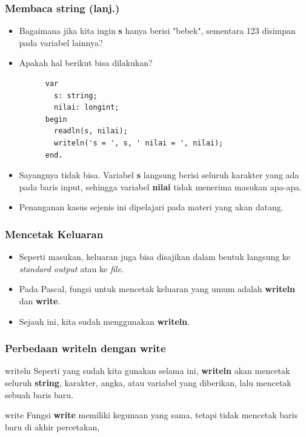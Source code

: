 \begin{frame}[fragile]
\frametitle{Membaca string (lanj.)}
\begin{itemize}
  \item Bagaimana jika kita ingin \textbf{s} hanya berisi "bebek", sementara 123 disimpan pada variabel lainnya?
  \item Apakah hal berikut bisa dilakukan?
    \begin{lstlisting}
      var
        s: string;
        nilai: longint;
      begin
        readln(s, nilai);
        writeln('s = ', s, ' nilai = ', nilai);
      end.
    \end{lstlisting}
  \item Sayangnya tidak bisa. Variabel \textbf{s} langsung berisi seluruh karakter yang ada pada baris input, sehingga variabel \textbf{nilai} tidak menerima masukan apa-apa.
  \item Penanganan kasus sejenis ini dipelajari pada materi yang akan datang.  
\end{itemize}
\end{frame}

\begin{frame}
\frametitle{Mencetak Keluaran}
\begin{itemize}
  \item Seperti masukan, keluaran juga bisa disajikan dalam bentuk langsung ke \textit{standard output} atau ke \textit{file}.
  \item Pada Pascal, fungsi untuk mencetak keluaran yang umum adalah \alert{\textbf{writeln}} dan \alert{\textbf{write}}.
  \item Sejauh ini, kita sudah menggunakan \textbf{writeln}.
\end{itemize}
\end{frame}

\begin{frame}[fragile]
\frametitle{Perbedaan writeln dengan write}
\begin{block}{writeln}
  Seperti yang sudah kita gunakan selama ini, \textbf{writeln} akan mencetak seluruh \textbf{string}, karakter, angka, atau variabel yang diberikan, lalu \alert{mencetak} sebuah baris baru.
\end{block}
\begin{block}{write}
  Fungsi \textbf{write} memiliki kegunaan yang sama, tetapi \alert{tidak mencetak} baris baru di akhir percetakan,
\end{block}
\end{frame}

